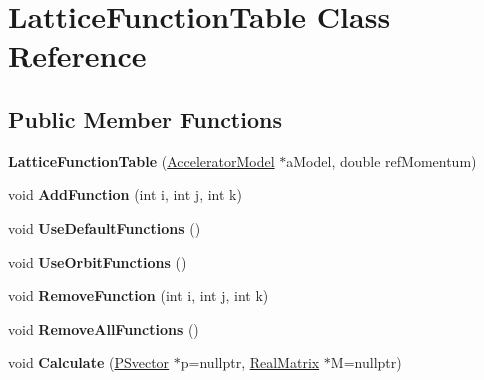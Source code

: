 \hypertarget{classLatticeFunctionTable}{}\section{Lattice\+Function\+Table Class Reference}
\label{classLatticeFunctionTable}
\subsection*{Public Member Functions}
\begin{DoxyCompactItemize}
\item 
\mbox{\label{classLatticeFunctionTable_a1f699b93a14d63db6175351364bb0414}} 
{\bfseries Lattice\+Function\+Table} (\hyperlink{classAcceleratorModel}{Accelerator\+Model} $\ast$a\+Model, double ref\+Momentum)
\item 
\mbox{\label{classLatticeFunctionTable_a7a3e7ef1ac7af2f54dedd6e35beca1d7}} 
void {\bfseries Add\+Function} (int i, int j, int k)
\item 
\mbox{\label{classLatticeFunctionTable_a71e3bf84eccace02070beba0fd37f9d4}} 
void {\bfseries Use\+Default\+Functions} ()
\item 
\mbox{\label{classLatticeFunctionTable_a5b9683ea74868114892d4cda7aaccf4f}} 
void {\bfseries Use\+Orbit\+Functions} ()
\item 
\mbox{\label{classLatticeFunctionTable_a4a478df4049debf8b540847f3e74659e}} 
void {\bfseries Remove\+Function} (int i, int j, int k)
\item 
\mbox{\label{classLatticeFunctionTable_ac4dcc64f14dbe857fd4edbddecf980cf}} 
void {\bfseries Remove\+All\+Functions} ()
\item 
\mbox{\label{classLatticeFunctionTable_a4d3087be8504ba32a8c61efc2e68947f}} 
void {\bfseries Calculate} (\hyperlink{classPSvector}{P\+Svector} $\ast$p=nullptr, \hyperlink{classTLAS_1_1Matrix}{Real\+Matrix} $\ast$M=nullptr)
\item 
\mbox{\label{classLatticeFunctionTable_a6652d49a6b053862cb7d9fbaf6f1ed77}} 

\end{DoxyCompactItemize}
